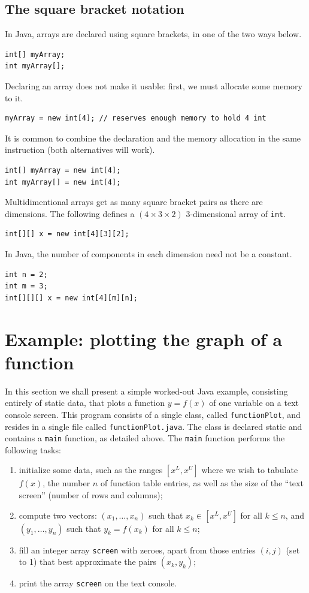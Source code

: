 \documentclass[a4paper]{book}
\theoremstyle{changebreak}                %
\begin{document}
\subsection{The square bracket notation}
In Java, arrays are declared using square
brackets, in one of the two ways below.
\begin{verbatim}
int[] myArray;
int myArray[];
\end{verbatim}
Declaring an array does not make it usable: first, we must allocate
some memory to it.
\begin{verbatim}
myArray = new int[4]; // reserves enough memory to hold 4 int
\end{verbatim}
It is common to combine the declaration and the memory allocation in
the same instruction (both alternatives will work).
\begin{verbatim}
int[] myArray = new int[4];
int myArray[] = new int[4];
\end{verbatim}
Multidimentional arrays get as many square bracket pairs as there are
dimensions. The following defines a $(4\times 3\times
2)$ 3-dimensional array of {\tt int}.
\begin{verbatim}
int[][] x = new int[4][3][2];
\end{verbatim}
In Java, the number of components in each dimension
need not be a constant. 
\begin{verbatim}
int n = 2;
int m = 3;
int[][][] x = new int[4][m][n];
\end{verbatim}


\section{Example: plotting the graph of a function}
In this section we shall present a simple worked-out Java example,
consisting entirely of static data, that plots a
function $y=f(x)$ of one variable on a text console
screen. This program consists of a single class, called
{\tt functionPlot}, and resides
in a single file called {\tt functionPlot.java}. The class is declared
static and contains a {\tt main}
function, as detailed above. The {\tt main} function performs the
following tasks:
\begin{enumerate}
\item initialize some data, such as the ranges $[x^L,x^U]$ where we
  wish to tabulate $f(x)$, the number $n$ of function table entries,
  as well as the size of the ``text screen'' (number of
  rows and columns);
\item compute two vectors: $(x_1,\ldots,x_n)$ such that
  $x_k\in[x^L,x^U]$ for all $k\le n$, and $(y_1,\ldots,y_n)$ such that
  $y_k=f(x_k)$ for all $k\le n$;
\item fill an integer array {\tt screen}
  with zeroes, apart from those entries $(i,j)$ (set to 1) that best
  approximate the pairs $(x_k,y_k)$;
\item print the array {\tt screen} on the text console.
\end{enumerate}
\end{document}

